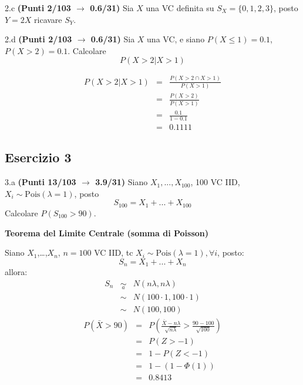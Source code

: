 \documentclass[
  11pt,
]{book}
\theoremstyle{mytheoremstyle}
\theoremstyle{mydefstyle}
\newenvironment{sol}
  {
  \begin{tcolorbox}[enhanced,breakable,arc=0.1mm,boxrule=1pt,colback=white,colframe=iblue,
  title=\bf \fontfamily{lmss}\selectfont \hspace{.5 cm} Soluzione,drop fuzzy shadow]

}{
\end{tcolorbox}
  }
\begin{document}
2.c \textbf{(Punti 2/103 \(\rightarrow\) 0.6/31)} Sia \(X\) una VC definita su \(S_X=\{0,1,2,3\}\), posto \(Y=2X\) ricavare \(S_Y\).

2.d \textbf{(Punti 2/103 \(\rightarrow\) 0.6/31)} Sia \(X\) una VC, e siano \(P(X\leq 1)=0.1\), \(P(X> 2)=0.1\). Calcolare
\[
P(X>2|X>1)
\]

\begin{sol}
\begin{eqnarray}
  P(X>2|X>1) &=&  \frac{P({X>2}\cap {X>1})}{P(X> 1)}\\
             &=&  \frac{P({X>2})}{P(X> 1)}\\
             &=&   \frac{0.1}{1-0.1}\\
             &=& 0.1111
\end{eqnarray}

\end{sol}

\subsection{Esercizio 3}\label{esercizio-3-42}

3.a \textbf{(Punti 13/103 \(\rightarrow\) 3.9/31)} Siano \(X_1,...,X_{100}\), 100 VC IID, \(X_i\sim \text{Pois}(\lambda=1)\), posto
\[
S_{100} = X_1+ ... +X_{100}
\]
Calcolare \(P(S_{100}>90)\).

\begin{sol}
\textbf{Teorema del Limite Centrale (somma di Poisson)}

Siano \(X_1\),\ldots,\(X_n\), \(n=100\) VC IID, tc \(X_i\sim\text{Pois}(\lambda=1)\)\(,\forall i\), posto:
\[
      S_n = X_1 + ... + X_n
      \]
allora:\begin{eqnarray*}
  S_n & \mathop{\sim}\limits_{a}& N(n\lambda,n\lambda) \\
  &\sim & N(100\cdot1,100\cdot1) \\
     &\sim & N(100,100) 
  \end{eqnarray*}\begin{eqnarray*}
      P( \bar X   >   90 ) 
        &=& P\left(  \frac { \bar X  -  n\lambda }{ \sqrt{n\lambda} }  >  \frac { 90  -  100 }{\sqrt{ 100 }} \right)  \\
                 &=& P\left(  Z   >   -1 \right) \\    &=& 1-P(Z< -1 )\\ 
                 &=&  1-(1-\Phi( 1 )) \\ &=&  0.8413 
      \end{eqnarray*}

\end{sol}
\end{document}
